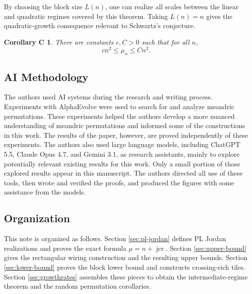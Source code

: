 \documentclass[11pt,a4paper]{amsart}
\newtheorem*{maincorollary}{Corollary C}
\theoremstyle{definition}
\theoremstyle{remark}
\DeclareMathOperator{\jcr}{jcr}
\begin{document}
By choosing the block size $L(n)$, one can realize all scales between the linear and quadratic regimes covered by this theorem. Taking $L(n)=n$ gives the quadratic-growth consequence relevant to Schwartz's conjecture.

\begin{maincorollary}
There are constants $c,C>0$ such that for all $n$,
\begin{equation*}
        c n^2
        \le
        \mu_{n}
        \le
        C n^2.
\end{equation*}
\end{maincorollary}


\subsection*{AI Methodology} 

The authors used AI systems during the research and writing process.  Experiments
with AlphaEvolve \cite{DBLP:journals/corr/abs-2506-13131,georgiev2025mathematical} were used to search for and analyze meandric permutations. These
experiments helped the authors develop a more nuanced understanding of meandric permutations and informed some of the constructions in this work.  The
results of the paper, however, are proved independently of these experiments.
The authors also used large language models, including ChatGPT 5.5, Claude Opus 4.7, and Gemini 3.1, as research assistants, mainly to explore potentially relevant existing results for this work. Only a small portion of those explored results appear in this manuscript. The authors directed all use of these tools, then wrote and verified the proofs, and produced the figures with some assistance from the models.

\subsection*{Organization}
This note is organized as follows.  Section \ref{sec:pl-jordan} defines PL Jordan realizations and proves the exact formula $\mu=n+\jcr$.  Section \ref{sec:upper-bound} gives the rectangular wiring construction and the resulting upper bounds.  Section \ref{sec:lower-bound} proves the block lower bound and constructs crossing-rich tiles. Section \ref{sec:growthrates} assembles these pieces to obtain the intermediate-regime theorem and the random permutation corollaries.
\end{document}
